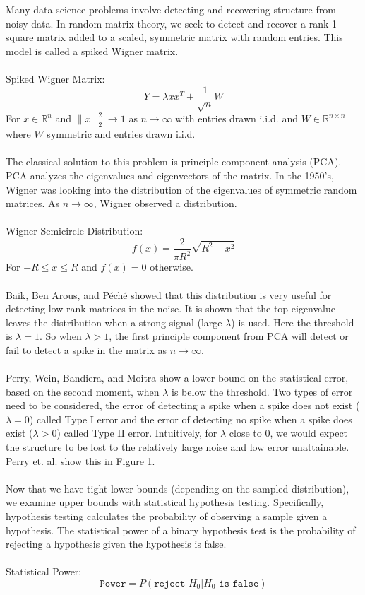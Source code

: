 \documentclass{article}
\begin{document}
Many data science problems involve detecting and recovering structure from noisy data. In random matrix theory, we seek to detect and recover a rank 1 square matrix added to a scaled, symmetric matrix with random entries. This model is called a spiked Wigner matrix.\\
\\
Spiked Wigner Matrix: 
$$Y = \lambda x x^T + \frac{1}{\sqrt{n}} W$$
For $x \in \mathbb{R}^n$ and $\|x\|_2^2 \rightarrow 1$ as $n \rightarrow \infty$ with entries drawn i.i.d. and $W \in \mathbb{R}^{n \times n}$ where $W$ symmetric and entries drawn i.i.d.\\
\\
The classical solution to this problem is principle component analysis (PCA). PCA analyzes the eigenvalues and eigenvectors of the matrix. In the 1950's, Wigner \cite{wigner} was looking into the distribution of the eigenvalues of symmetric random matrices. As $n \rightarrow \infty$, Wigner observed a distribution.\\
\\
Wigner Semicircle Distribution:
$$ f(x) = \frac{2}{\pi R^2}\sqrt{R^2-x^2} $$
For $-R \le x \le R$ and $f(x) = 0$ otherwise.\\
\\
Baik, Ben Arous, and P\'{e}ch\'{e} \cite{arous} showed that this distribution is very useful for detecting low rank matrices in the noise. It is shown that the top eigenvalue leaves the distribution when a strong signal (large $ \lambda $) is used. Here the threshold is $\lambda=1$. So when $\lambda>1$, the first principle component from PCA will detect or fail to detect a spike in the matrix as $n \rightarrow \infty$. \\
\\
Perry, Wein, Bandiera, and Moitra \cite{perry} show a lower bound on the statistical error, based on the second moment, when $\lambda$ is below the threshold. Two types of error need to be considered, the error of detecting a spike when a spike does not exist ($\lambda=0$) called Type I error and the error of detecting no spike when a spike does exist ($\lambda>0$) called Type II error. Intuitively, for $\lambda$ close to $0$, we would expect the structure to be lost to the relatively large noise and low error unattainable. Perry et. al. show this in \cite{perry} Figure 1.\\
\\
Now that we have tight lower bounds (depending on the sampled distribution), we examine upper bounds with statistical hypothesis testing. Specifically, hypothesis testing calculates the probability of observing a sample given a hypothesis. The statistical power of a binary hypothesis test is the probability of rejecting a hypothesis given the hypothesis is false.\\
\\
Statistical Power:
$$ \texttt{Power} = P(\texttt{reject } H_0|H_0 \texttt{ is false}) $$
\end{document}
